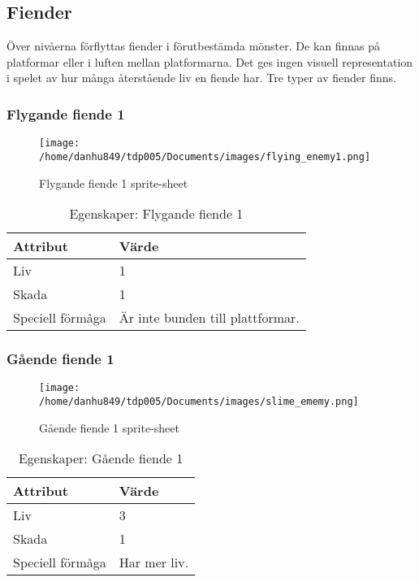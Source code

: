 \documentclass{TDP005mall}
\begin{document}
\subsection{Fiender}
Över nivåerna förflyttas fiender i förutbestämda mönster. De kan finnas på platformar eller i luften mellan platformarna. Det ges ingen visuell representation i spelet av hur många återstående liv en fiende har. Tre typer av fiender finns.

\subsubsection*{Flygande fiende 1}
\begin{figure}[h!]
  \caption{Flygande fiende 1 sprite-sheet\label{fig:1}}
  \centerline{\texttt{[image: /home/danhu849/tdp005/Documents/images/flying\_enemy1.png]}}
\end{figure}

\begin{table}[h!]
  \centering
  \caption{Egenskaper: Flygande fiende 1\label{tab:2}}
\begin{tabular}{|l|l|}
\hline
Attribut & Värde \\\hline
Liv & 1 \\\hline
Skada & 1 \\\hline
Speciell förmåga & Är inte bunden till plattformar. \\\hline
\end{tabular}
\end{table}
\subsubsection*{Gående fiende 1}
\begin{figure}[h!]
  \centerline{\texttt{[image: /home/danhu849/tdp005/Documents/images/slime\_ememy.png]}}
  \caption{Gående fiende 1 sprite-sheet\label{fig:2}}
\end{figure}

\begin{table}[h!]
  \centering
  \caption{Egenskaper: Gående fiende 1\label{tab:3}}
\begin{tabular}{|l|l|}
\hline
Attribut & Värde \\\hline
Liv & 3 \\\hline
Skada & 1 \\\hline
Speciell förmåga & Har mer liv. \\\hline
\end{tabular}
\end{table}
\end{document}
